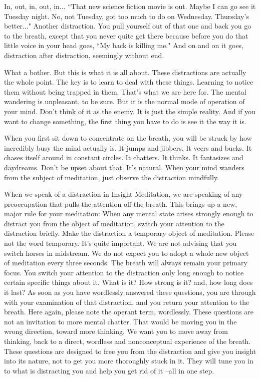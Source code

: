 In, out, in, out, in... ``That new science fiction movie is out. Maybe I can go
see it Tuesday night. No, not Tuesday, got too much to do on Wednesday.
Thursday's better..." Another distraction. You pull yourself out of that one and
back you go to the breath, except that you never quite get there because before
you do that little voice in your head goes, ``My back is killing me." And on and
on it goes, distraction after distraction, seemingly without end.

What a bother. But this is what it is all about. These distractions are actually
the whole point. The key is to learn to deal with these things. Learning to
notice them without being trapped in them. That's what we are here for. The
mental wandering is unpleasant, to be sure. But it is the normal mode of
operation of your mind. Don't think of it as the enemy. It is just the simple
reality. And if you want to change something, the first thing you have to do is
see it the way it is.

When you first sit down to concentrate on the breath, you will be struck by how
incredibly busy the mind actually is. It jumps and jibbers. It veers and bucks.
It chases itself around in constant circles. It chatters. It thinks. It
fantasizes and daydreams. Don't be upset about that. It's natural. When your
mind wanders from the subject of meditation, just observe the distraction
mindfully.

When we speak of a distraction in Insight Meditation, we are speaking of any
preoccupation that pulls the attention off the breath.  This brings up a new,
major rule for your meditation: When any mental state arises strongly enough to
distract you from the object of meditation, switch your attention to the
distraction briefly. Make the distraction a temporary object of meditation.
Please not the word temporary. It's quite important. We are not advising that
you switch horses in midstream. We do not expect you to adopt a whole new object
of meditation every three seconds. The breath will always remain your primary
focus. You switch your attention to the distraction only long enough to notice
certain specific things about it. What is it? How strong is it? and, how long
does it last? As soon as you have wordlessly answered these questions, you are
through with your examination of that distraction, and you return your attention
to the breath. Here again, please note the operant term, wordlessly. These
questions are not an invitation to more mental chatter. That would be moving you
in the wrong direction, toward more thinking. We want you to move away from
thinking, back to a direct, wordless and nonconceptual experience of the breath.
These questions are designed to free you from the distraction and give you
insight into its nature, not to get you more thoroughly stuck in it. They will
tune you in to what is distracting you and help you get rid of it --all in one
step.

